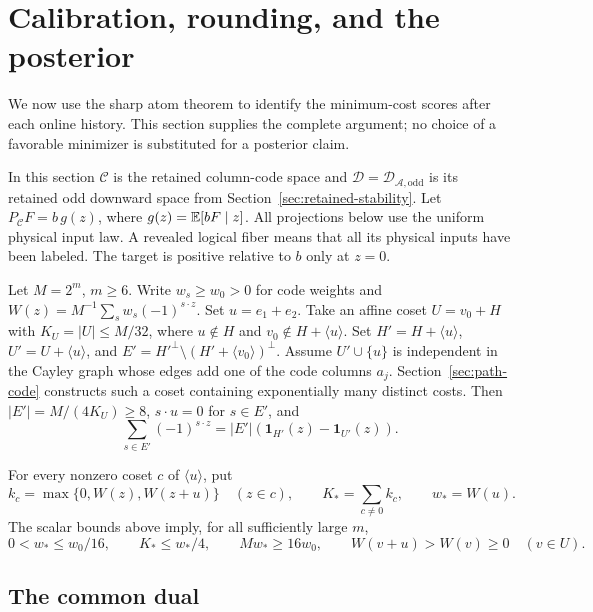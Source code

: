 \section{Calibration, rounding, and the posterior}
\label{sec:online}

We now use the sharp atom theorem to identify the minimum-cost scores
after each online history. This section supplies the complete argument;
no choice of a favorable minimizer is substituted for a posterior claim.

In this section $\mathcal C$ is the retained column-code space and
$\mathcal D=\mathcal D_{\mathcal A,\mathrm{odd}}$ is its retained
odd downward space from Section~\ref{sec:retained-stability}.
Let $P_{\mathcal C}F=b\,g(z)$, where $g(z)=\mathbb E[bF\mid z]$.
All projections below use the uniform physical input law.
A revealed logical fiber means that all its physical inputs have been
labeled. The target is positive relative to $b$ only at $z=0$.

Let $M=2^m$, $m\ge6$. Write
$w_s\ge w_0>0$ for code weights and
$W(z)=M^{-1}\sum_s w_s(-1)^{s\cdot z}$. Set $u=e_1+e_2$.
Take an affine coset $U=v_0+H$ with $K_U=|U|\le M/32$,
where $u\notin H$ and $v_0\notin H+\langle u\rangle$. Set
$H'=H+\langle u\rangle$, $U'=U+\langle u\rangle$, and
$E'=H'^\perp\setminus(H'+\langle v_0\rangle)^\perp$.
Assume $U'\cup\{u\}$ is independent in the Cayley graph whose
edges add one of the code columns $a_j$. Section~\ref{sec:path-code}
constructs such a coset containing exponentially many distinct costs.
Then $|E'|=M/(4K_U)\ge8$, $s\cdot u=0$ for $s\in E'$, and
\[
 \sum_{s\in E'}(-1)^{s\cdot z}
 =|E'|(\mathbf1_{H'}(z)-\mathbf1_{U'}(z)).
\]

For every nonzero coset $c$ of $\langle u\rangle$, put
\[
 k_c=\max\{0,W(z),W(z+u)\}\quad(z\in c),\qquad
 K_* =\sum_{c\ne0}k_c,\qquad w_*=W(u).
\]
The scalar bounds above imply, for all sufficiently large $m$,
\begin{equation}\label{eq:rect-dominance}
 0<w_*\le w_0/16,\qquad K_*\le w_*/4,\qquad M w_*\ge16w_0,
 \qquad W(v+u)>W(v)\ge0\quad(v\in U).
\end{equation}

\subsection{The common dual}

